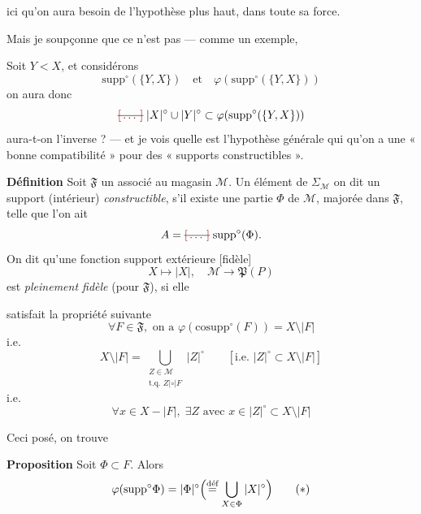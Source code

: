 \documentclass[11pt,a4paper]{article}
\begin{document}
  ici qu'on aura besoin de l'hypothèse \add{*} plus haut, dans toute sa force.

Mais je soupçonne que ce n'est pas \ill{} \ill{} — comme un exemple, \ill{}

Soit $Y < X$, et considérons
\[
\mathrm{supp}^\circ(\{Y,X\}) \quad\text{et}\quad \varphi(\mathrm{supp}^\circ(\{Y,X\}))
\]
on aura donc
\[
\text{\struck{\ill{}}}\; |X|^\circ \cup |Y|^\circ \subset \varphi(\mathrm{supp}^\circ(\{Y,X\}))
\]
aura-t-on l'inverse ?   — et je vois  quelle est l'hypothèse générale qui \struck{\ill{}}  qu'on a une « bonne compatibilité » pour des « supports  constructibles ».

\textbf{Définition} Soit $\mathfrak{F}$ un \ill{} associé au magasin $\mathcal{M}$. Un élément  de $\Sigma_{\mathcal{M}}$ on dit un support (intérieur) \textit{constructible}, s'il existe une   partie $\Phi$ de $\mathcal{M}$, majorée dans $\mathfrak{F}$, telle que l'on ait
\[
A = \text{\struck{\ill{}}}\; \mathrm{supp}^\circ(\Phi) .
\]
On dit qu'une fonction support  extérieure [fidèle]
\[
X \longmapsto |X|, \quad \mathcal{M} \longrightarrow \mathfrak{P}(P)
\]
est \textit{pleinement fidèle} (pour $\mathfrak{F}$), si elle


satisfait la propriété suivante
\[
\forall F \in \mathfrak{F}, \text{ on a } \varphi(\mathrm{cosupp}^\circ(F)) = X \setminus |F|
\]
i.e.
\[
X\setminus|F| = \bigcup_{\substack{Z\in\mathcal{M}\\ \text{t.q. } Z \mathrel{|{\circ}|} F}} |Z|^\circ
\qquad [\text{i.e. } |Z|^\circ \subset X\setminus|F|]
\]
i.e.
\[
\boxed{\forall x \in X - |F|, \;\exists Z \text{ avec } x \in |Z|^\circ \subset X\setminus|F|}
\]

Ceci posé, on trouve

\textbf{Proposition} Soit $\Phi \subset F$. Alors
\[
\varphi(\mathrm{supp}^\circ\Phi) = |\Phi|^\circ \Bigl(\overset{\text{déf}}{=} \bigcup_{X\in\Phi} |X|^\circ\Bigr) \qquad (*)
\]
\end{document}
